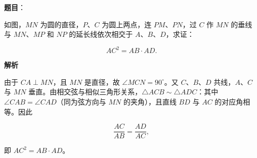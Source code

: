 \begin{answer}

\textbf{题目}：

如图，$MN$ 为圆的直径，$P\text{、}C$ 为圆上两点，连 $PM\text{、}PN$，过 $C$ 作 $MN$ 的垂线与 $MN\text{、}MP$ 和 $NP$ 的延长线依次相交于 $A\text{、}B\text{、}D$，求证：

\nopagebreak[4]
\[
AC^2=AB\cdot AD.
\]
\nopagebreak[4]
\begin{center}\end{center}
\nopagebreak[4]
\textbf{解析}

由于 $CA\perp MN$，且 $MN$ 是直径，故 $\angle MCN=90^\circ$。又 $C\text{、}B\text{、}D$ 共线，$A\text{、}C$ 与 $MN$ 垂直。由相交弦与相似三角形关系，$\triangle ACB\sim\triangle ADC$：其中 $\angle CAB=\angle CAD$（同为弦方向与 $MN$ 的夹角），且直线 $BD$ 与 $AC$ 的对应角相等。因此

\nopagebreak[4]
\[
\frac{AC}{AB}=\frac{AD}{AC},
\]

即 $AC^2=AB\cdot AD$。


\end{answer}
